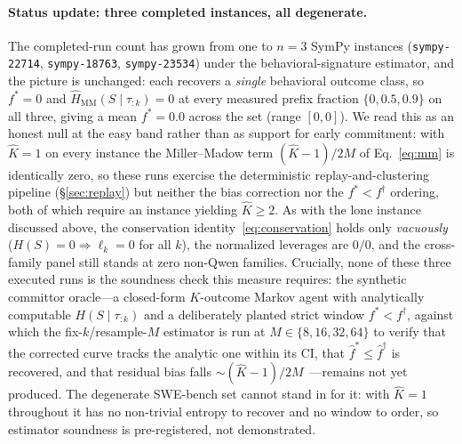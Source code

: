 \documentclass[11pt]{article}
\newcommand{\strat}{S}
\newcommand{\prefix}{\tau_{:k}}
\begin{document}
\paragraph{Status update: three completed instances, all degenerate.}
The completed-run count has grown from one to $n\!=\!3$ SymPy instances
(\texttt{sympy-22714}, \texttt{sympy-18763}, \texttt{sympy-23534}) under the
behavioral-signature estimator, and the picture is unchanged: each recovers a
\emph{single} behavioral outcome class, so $f^\ast=0$ and
$\widehat{H}_{\mathrm{MM}}(\strat\mid\prefix)=0$ at every measured prefix fraction
$\{0,0.5,0.9\}$ on all three, giving a mean $f^\ast=0.0$ across the set (range
$[0,0]$). We read this as an honest null at the easy band rather than as support
for early commitment: with $\hat K=1$ on every instance the Miller--Madow term
$(\hat K-1)/2M$ of Eq.~\eqref{eq:mm} is identically zero, so these runs exercise
the deterministic replay-and-clustering pipeline (\S\ref{sec:replay}) but neither
the bias correction nor the $f^\ast\!<\!f^\dagger$ ordering, both of which require
an instance yielding $\hat K\ge2$. As with the lone instance discussed above, the
conservation identity~\eqref{eq:conservation} holds only \emph{vacuously}
($H(\strat)=0\Rightarrow\ell_k=0$ for all $k$), the normalized leverages are
$0/0$, and the cross-family panel still stands at zero non-Qwen families.
Crucially, none of these three executed runs is the soundness check this measure
requires: the synthetic committor oracle---a closed-form $K$-outcome Markov agent
with analytically computable $H(\strat\mid\tau_{:k})$ and a deliberately planted
strict window $f^\ast<f^\dagger$, against which the fix-$k$/resample-$M$
estimator is run at $M\in\{8,16,32,64\}$ to verify that the corrected curve tracks
the analytic one within its CI, that $\widehat f^\ast\le\widehat f^\dagger$ is
recovered, and that residual bias falls $\sim(\hat K-1)/2M$~\citep{evanden2010tpt,farquhar2024semantic,kuhn2023semantic,cover2006elements}---remains
not yet produced. The degenerate SWE-bench set cannot stand in for it: with
$\hat K=1$ throughout it has no non-trivial entropy to recover and no window to
order, so estimator soundness is pre-registered, not demonstrated.
\end{document}
